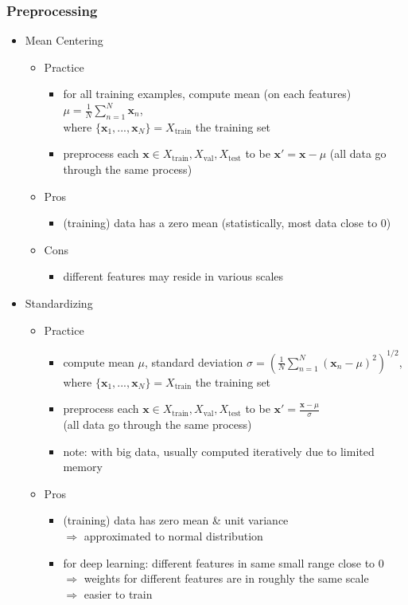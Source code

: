 \subsubsection{Preprocessing}
\begin{itemize}
\item Mean Centering
	\begin{itemize}
	\item Practice
		\begin{itemize}
		\item for all training examples, compute mean (on each features) $\displaystyle \mu=\frac 1 N \sum_{n=1}^N{\mathbf x_n}$, \\
		where $\{\mathbf x_1,...,\mathbf x_N\}=X_\text{train}$ the training set
		\item preprocess each $\mathbf x \in X_\text{train}, X_\text{val}, X_\text{test}$ to be $\mathbf x'=\mathbf x -\mu$
		(all data go through the same process)
		\end{itemize}
	\item Pros
		\begin{itemize}
		\item (training) data has a zero mean (statistically, most data close to $0$)
		\end{itemize}
	\item Cons
		\begin{itemize}
		\item different features may reside in various scales
		\end{itemize}
	\end{itemize}
\item Standardizing
	\begin{itemize}
	\item Practice
		\begin{itemize}
		\item compute mean $\mu$, standard deviation $\displaystyle \sigma=\left( \frac 1 N \sum_{n=1}^N{(\mathbf x_n-\mu)^2} \right)^{1/2}$, \\
		where $\{\mathbf x_1,...,\mathbf x_N\}=X_\text{train}$ the training set
		\item preprocess each $\mathbf x \in X_\text{train}, X_\text{val}, X_\text{test}$ to be $\mathbf x'=\frac{\mathbf x -\mu} \sigma$ \\ 
		(all data go through the same process)
		\item note: with big data, usually computed iteratively due to limited memory
		\end{itemize}
	\item Pros
		\begin{itemize}
		\item (training) data has zero mean \& unit variance \\
		$\Rightarrow$ approximated to normal distribution
		\item for deep learning: different features in same small range close to $0$ \\
		$\Rightarrow$ weights for different features are in roughly the same scale \\
		$\Rightarrow$ easier to train
		\end{itemize}
	\end{itemize}


\end{itemize}
